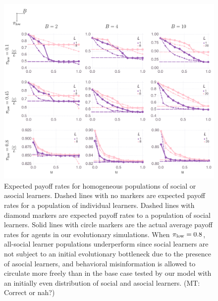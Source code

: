 \documentclass[letterpaper,11.5pt]{scrartcl}
\newcommand{\mt}[1]{{\textcolor{myorange} {({\tiny MT:} #1)}}}
\begin{document}

\begin{figure}
  \caption{Expected payoff rates for homogeneous populations of social or asocial learners. Dashed lines with no markers are expected payoff rates for a population of individual learners. Dashed lines with diamond markers are expected payoff rates to a population of social learners. Solid lines with circle markers are the actual average payoff rates for agents in our evolutionary simulations.  When $\pi_{\mathrm{low}} = 0.8$, all-social learner populations underperform
    since social learners are not subject to an initial evolutionary bottleneck
    due to the presence of asocial learners, and behavioral misinformation
    is allowed to circulate more freely than in the base case tested by 
    our model with an initially even distribution of social and asocial learners.
    \mt{Correct or nah?}
}
  \label{fig:payoffs}
  \centering
    \includegraphics[width=\textwidth]{Figures/supplement/fullMeanPrevNetPayoffs.pdf}
\end{figure}
\end{document}
